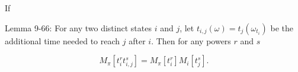 If

Lemma 9-66: For any two distinct states $i$ and $j$, let $t_{i,j}(\omega) = t_j(\omega_{t_i})$ be the additional time needed to reach $j$ after $i$. Then for any powers $r$ and $s$

$$M_\pi[t_i^r t_{i,j}^s] = M_\pi[t_i^r] M_i[t_j^s].$$

